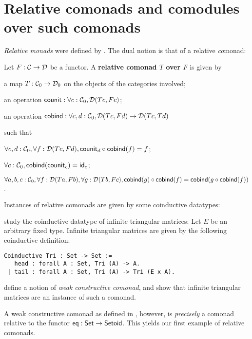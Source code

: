 \documentclass{amsart}
\newcommand{\fat}[1]{\textbf{#1}}
\begin{document}
\section{Relative comonads and comodules over such comonads}\label{sec:comonads}

\emph{Relative monads} were defined by \textcite{DBLP:conf/fossacs/AltenkirchCU10}.
The dual notion is that of a relative \emph{co}monad:

\begin{definition}\label{def:rel_comonad}
  Let $F:\C\to\D$ be a functor. A \fat{relative comonad $T$ over $F$} is given by
  \begin{packitem}
   \item a map $T:\C_0 \to \D_0$ on the objects of the categories involved;
   \item an operation $\counit : \forall c : \C_0, \D(Tc,Fc)$;
   \item an operation $\cobind: \forall c,d:\C_0, \D(Tc,Fd) \to \D(Tc,Td)$
  \end{packitem}
  such that 
  \begin{packitem}
   \item $\forall c,d:\C_0, \forall f:\D(Tc,Fd), \comp{\cobind(f)}{\counit_d} = f$;
   \item $\forall c : \C_0, \cobind(\counit_c) = \id_c$;
   \item $\forall a,b,c:\C_0, \forall f : \D(Ta,Fb),\forall g:\D(Tb,Fc), \\
        \comp{\cobind(f)}{\cobind(g)} = \cobind(\comp{\cobind(f)}{g})$.
  \end{packitem} 
\end{definition}

Instances of relative comonads are given by some coinductive datatypes:


\begin{example}\label{ex:tri_comonad}
  \textcite{DBLP:conf/types/MatthesP11} study the coinductive datatype of infinite triangular matrices:
Let $E$ be an arbitrary fixed type.
   Infinite triangular matrices are given by the following coinductive definition: 
  \begin{lstlisting}
Coinductive Tri : Set -> Set :=
   head : forall A : Set, Tri (A) -> A.
 | tail : forall A : Set, Tri (A) -> Tri (E x A).
  \end{lstlisting}
%
  \textcite{DBLP:conf/types/MatthesP11} define a notion of \emph{weak constructive comonad}, and show that infinite triangular matrices
  are an instance of such a comonad.
   
  A weak constructive comonad as defined in \parencite{DBLP:conf/types/MatthesP11}, however, is \emph{precisely}
  a comonad relative to the functor $\eq : \Set\to\Setoid$.
  This yields our first example of relative comonads. 
\end{example}
\end{document}
